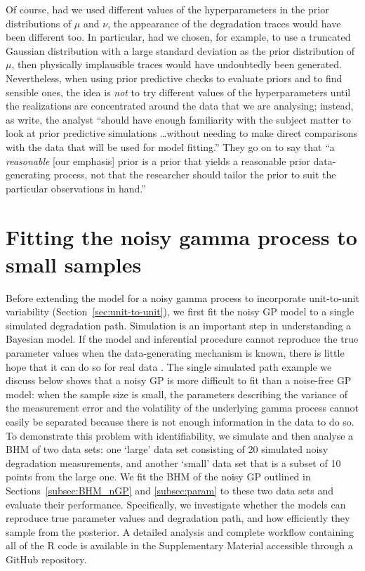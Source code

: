 \documentclass{article}
\begin{document}
Of course, had we used different values of the hyperparameters in the prior distributions of $\mu$ and $\nu$, the appearance of the degradation traces would have been different too. In particular, had we chosen, for example, to use a truncated Gaussian distribution with a large standard deviation as the prior distribution of $\mu$, then physically implausible traces would have undoubtedly been generated. Nevertheless, when using prior predictive checks to evaluate priors and to find sensible ones, the idea is \textit{not} to try different values of the hyperparameters until the realizations are concentrated around the data that we are analysing; instead, as \citet{gabry_vis_2019a} write, the analyst ``should have enough familiarity with the subject matter to look at prior predictive simulations \ldots without needing to make direct comparisons with the data that will be used for model fitting.'' They go on to say that ``a \textit{reasonable} [our emphasis] prior is a prior that yields a reasonable prior data-generating process, not that the researcher should tailor the prior to suit the particular observations in hand.''

\section{Fitting the noisy gamma process to small samples}
\label{sec:noisy_gp}

Before extending the model for a noisy gamma process to incorporate unit-to-unit variability (Section~\ref{sec:unit-to-unit}), we first fit the noisy GP model to a single simulated degradation path. Simulation is an important step in understanding a Bayesian model. If the model and inferential procedure cannot reproduce the true parameter values when the data-generating mechanism is known, there is little hope that it can do so for real data \citep{gelman_bayesian_2020}. The single simulated path example we discuss below shows that a noisy GP is more difficult to fit than a noise-free GP model: when the sample size is small, the parameters describing the variance of the measurement error and the volatility of the underlying gamma process cannot easily be separated because there is not enough information in the data to do so. To demonstrate this problem with identifiability, we simulate and then analyse a BHM of two data sets: one `large' data set consisting of 20 simulated noisy degradation measurements, and another `small' data set that is a subset of 10 points from the large one. We fit the BHM of the noisy GP outlined in Sections~\ref{subsec:BHM_nGP} and \ref{subsec:param} to these two data sets and evaluate their performance. Specifically, we investigate whether the models can reproduce true parameter values and degradation path, and how efficiently they sample from the posterior. A detailed analysis and complete workflow containing all of the R code is available in the Supplementary Material accessible through a GitHub repository.
\end{document}
